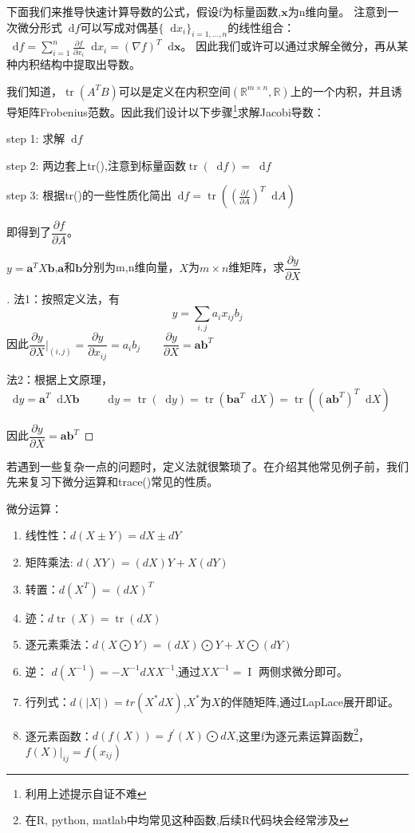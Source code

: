\documentclass[cn,hazy,green,12pt,normal]{elegantnote}
\DeclareMathOperator{\tr}{tr}
\newcommand{\p}{\partial}
\renewcommand{\d}{\mathop{}\!\mathrm{d}}
\newcommand{\MR}{\mathbb R}
\DeclareMathOperator{\I}{I}
\numberwithin{equation}{section}
\numberwithin{subsection}{section}
\begin{document}
下面我们来推导快速计算导数的公式，假设f为标量函数,$\bm x$为n维向量。
注意到一次微分形式$\d f$可以写成对偶基$\{\d x_i\}_{i=1,\dots,n}$的线性组合：$\d f = \sum_{i=1}^n
\frac{\p f}{\p x_i} \d x_i = (\nabla f)^T \d \bm x$。
因此我们或许可以通过求解全微分，再从某种内积结构中提取出导数。

我们知道，$\tr(A^T B)$可以是定义在内积空间$(\MR^{m\times n}, \MR)$上的一个内积，并且诱导矩阵Frobenius范数。因此我们设计以下步骤\footnote{利用上述提示自证不难}求解Jacobi导数：

step 1: 求解$\d f$
\vspace{-1em}

step 2: 两边套上tr(),注意到标量函数$\tr(\d f) = \d f$
\vspace{-1em}

step 3: 根据tr()的一些性质化简出$\d f = \tr((\frac{\p f}{\p A})^T \d A)$

即得到了$\dfrac{\p f}{\p A}$。

\begin{example}
$y= \bm a^T X \bm b$,$\bm a$和$\bm b$分别为m,n维向量，$X$为$m\times n$维矩阵，求$\dfrac{\p y}{\p X}$
\end{example}

\begin{proof}[\solutionname]
    法1：按照定义法，有
    \[
    y = \sum_{i,j} a_i x_{ij} b_j
    \]
    因此$\dfrac{\p y}{\p X}\bigg|_{(i,j)}=\dfrac{\p y}{\p x_{ij}}=a_ib_j \qquad \dfrac{\p y}{\p X}=\bm a  \bm b^T$

    法2：根据上文原理，$\d y = \bm a^T \d X \bm b \qquad \d y = \tr (\d y)=\tr (\bm b \bm a^T \d X)=\tr((\bm a \bm b^T)^T \d X)$
    
    因此$\dfrac{\p y}{\p X}=\bm a  \bm b^T$
\end{proof}
若遇到一些复杂一点的问题时，定义法就很繁琐了。在介绍其他常见例子前，我们先来复习下微分运算和trace()常见的性质。

微分运算：
\begin{enumerate}
    \item 线性性：$d(X \pm Y) = d X \pm d Y$
    \item 矩阵乘法: $d(XY)=(dX)Y+X(dY)$
    \item 转置：$d(X^T)=(dX)^T$
    \item 迹：$d\tr(X)=\tr(dX)$
    \item 逐元素乘法：$d(X\bigodot Y)=(dX)\bigodot Y+X \bigodot (dY)$
    \item 逆： $d(X^{-1})= -X^{-1}dX X^{-1}$,通过$X X^{-1}=\I$ 两侧求微分即可。
    \item 行列式：$d(|X|)=tr(X^* dX)$,$X^*$为$X$的伴随矩阵,通过LapLace展开即证。
    \item 逐元素函数：$d (f(X))=f^{'} (X)\bigodot d X$,这里f为逐元素运算函数\footnote{在R, python, matlab中均常见这种函数,后续R代码块会经常涉及}，$f(X)\bigg|_{ij}=f(x_{ij})$
\end{enumerate}
\end{document}
